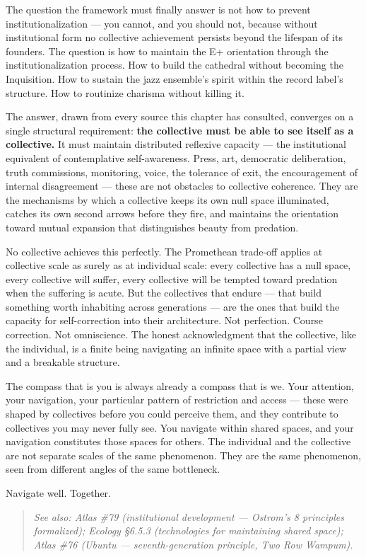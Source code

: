 The question the framework must finally answer is not how to prevent institutionalization — you cannot, and you should not, because without institutional form no collective achievement persists beyond the lifespan of its founders. The question is how to maintain the E+ orientation through the institutionalization process. How to build the cathedral without becoming the Inquisition. How to sustain the jazz ensemble's spirit within the record label's structure. How to routinize charisma without killing it.


The answer, drawn from every source this chapter has consulted, converges on a single structural requirement: \textbf{the collective must be able to see itself as a collective.} It must maintain distributed reflexive capacity — the institutional equivalent of contemplative self-awareness. Press, art, democratic deliberation, truth commissions, monitoring, voice, the tolerance of exit, the encouragement of internal disagreement — these are not obstacles to collective coherence. They are the mechanisms by which a collective keeps its own null space illuminated, catches its own second arrows before they fire, and maintains the orientation toward mutual expansion that distinguishes beauty from predation.


No collective achieves this perfectly. The Promethean trade-off applies at collective scale as surely as at individual scale: every collective has a null space, every collective will suffer, every collective will be tempted toward predation when the suffering is acute. But the collectives that endure — that build something worth inhabiting across generations — are the ones that build the capacity for self-correction into their architecture. Not perfection. Course correction. Not omniscience. The honest acknowledgment that the collective, like the individual, is a finite being navigating an infinite space with a partial view and a breakable structure.


The compass that is you is always already a compass that is we. Your attention, your navigation, your particular pattern of restriction and access — these were shaped by collectives before you could perceive them, and they contribute to collectives you may never fully see. You navigate within shared spaces, and your navigation constitutes those spaces for others. The individual and the collective are not separate scales of the same phenomenon. They are the same phenomenon, seen from different angles of the same bottleneck.


Navigate well. Together.


\begin{quote}
\itshape
\textit{See also: Atlas \#79 (institutional development — Ostrom's 8 principles formalized); Ecology §6.5.3 (technologies for maintaining shared space); Atlas \#76 (Ubuntu — seventh-generation principle, Two Row Wampum).}
\end{quote}


\bigskip\noindent\makebox[\textwidth]{\color{rulegray}\rule{5cm}{0.3pt}}\bigskip
